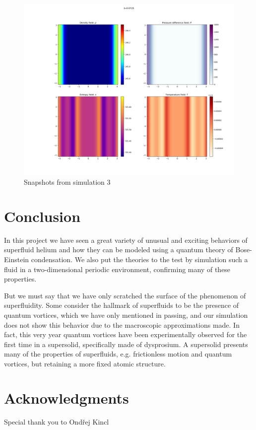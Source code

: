 \documentclass{article}
\begin{document}
\begin{figure}[h]
    \includegraphics[width=\textwidth/3]{Sim 2/SF02_0029.png}
    \caption{Snapshots from simulation 3}
    \label{sim3}
\end{figure}

\section{Conclusion}


In this project we have seen a great variety of unusual and exciting behaviors of superfluid helium and how they can be modeled using a quantum theory of Bose-Einstein condensation.  We also put the theories to the test by simulation such a fluid in a two-dimensional periodic environment, confirming many of these properties.

But we must say that we have only scratched the surface of the phenomenon of superfluidity.  Some consider the hallmark of superfluids to be the presence of quantum vortices, which we have only mentioned in passing, and our simulation  does not show this behavior due to the macroscopic approximations made.  In fact, this very year quantum vortices have been experimentally observed for the first time in a supersolid, specifically made of dysprosium.  A supersolid presents many of the properties of superfluids, e.g. frictionless motion and quantum vortices, but retaining a more fixed atomic structure.
 
\section{Acknowledgments}

Special thank you to Ondřej Kincl



\end{document}
